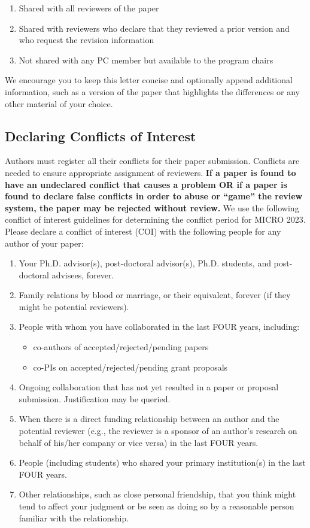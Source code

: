 \documentclass{common/sig-alternate}
\begin{document}
\begin{enumerate}
\item Shared with all reviewers of the paper 
\item Shared with reviewers who declare that they reviewed a prior version and who request the revision information
\item Not shared with any PC member but available to the program chairs
\end{enumerate}

We encourage you to keep this letter concise and optionally append additional information, such as a version of the paper that highlights the differences or any other material of your choice.

\subsection{Declaring Conflicts of Interest}
Authors must register all their conflicts for their paper submission. Conflicts are needed to ensure appropriate assignment of reviewers. {\bf If a paper is found to have an undeclared conflict that causes a problem OR if a paper is found to declare false conflicts in order to abuse or ``game'' the review system, the paper may be rejected without review.} We use the following conflict of interest guidelines for determining the conflict period for MICRO 2023.  Please declare a conflict of interest (COI) with the following people for any author of your paper:

\begin{enumerate}
\item Your Ph.D. advisor(s), post-doctoral advisor(s), Ph.D. students,
      and post-doctoral advisees, forever.
\item Family relations by blood or marriage, or their equivalent,
      forever (if they might be potential reviewers).
\item People with whom you have collaborated in the last FOUR years, including:
  \begin{itemize}
  \item co-authors of accepted/rejected/pending papers
  \item co-PIs on accepted/rejected/pending grant proposals
  \end{itemize}
\item Ongoing collaboration that has not yet resulted in a paper or proposal submission. Justification may be queried.
\item When there is a direct funding relationship between an author and the potential reviewer (e.g., the reviewer is a sponsor of an author's research on behalf of his/her company or vice versa) in the last FOUR years.
\item People (including students) who shared your primary institution(s) in the last FOUR years.
\item Other relationships, such as close personal friendship, that you think might tend
to affect your judgment or be seen as doing so by a reasonable person familiar
with the relationship.
\end{enumerate}
\end{document}
